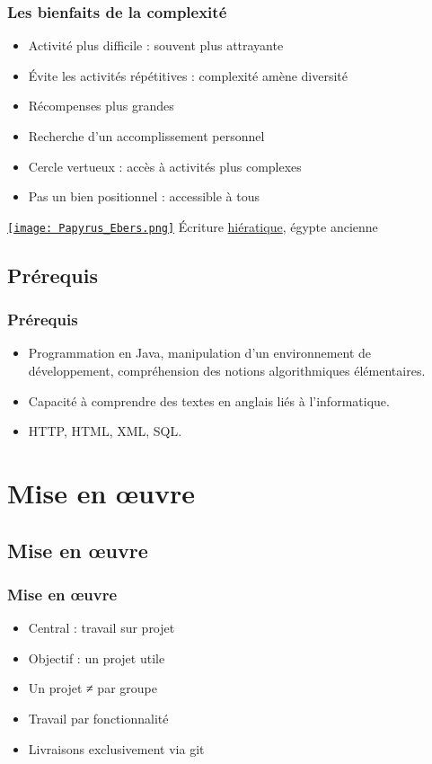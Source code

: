 \documentclass[english, french]{beamer}
\begin{document}
\begin{frame}
	\frametitle{Les bienfaits de la complexité}
	\begin{minipage}{6cm}
		\begin{itemize}
			\item Activité plus difficile : souvent plus attrayante
			\item Évite les activités répétitives : complexité amène diversité
			\item Récompenses plus grandes
			\item Recherche d’un accomplissement personnel
			\item Cercle vertueux : accès à activités plus complexes
			\item Pas un bien positionnel : accessible à tous
		\end{itemize}
	\end{minipage}\hspace{5mm}%
	\begin{minipage}{\columnwidth-6.5cm}
		\href{https://fr.wikipedia.org/wiki/\%C3\%89criture_hi\%C3\%A9ratique}{\texttt{[image: Papyrus\_Ebers.png]}}
		\small{Écriture \href{https://en.wikipedia.org/wiki/Hieratic}{hiératique}, égypte ancienne}
	\end{minipage}
\end{frame}

\subsection{Prérequis}
\begin{frame}
	\frametitle{Prérequis}
	\begin{itemize}
		\item Programmation en Java, manipulation d’un environnement de développement, compréhension des notions algorithmiques élémentaires.
		\item Capacité à comprendre des textes en anglais liés à l’informatique.
		\item HTTP, HTML, XML, SQL.
	\end{itemize}
\end{frame}

\section{Mise en œuvre}
\subsection{Mise en œuvre}
\begin{frame}
	\frametitle{Mise en œuvre}
	\begin{itemize}
		\item Central : travail sur projet
		\item Objectif : un projet utile
		\item Un projet ≠ par groupe
		\item Travail par fonctionnalité
		\item Livraisons exclusivement via git
	\end{itemize}
\end{frame}
\end{document}
